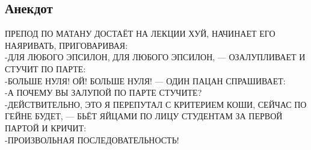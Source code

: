 \documentclass[12pt]{article}
\begin{document}
\subsection*{Анекдот}
ПРЕПОД ПО МАТАНУ ДОСТАЁТ НА ЛЕКЦИИ ХУЙ, НАЧИНАЕТ ЕГО НАЯРИВАТЬ, ПРИГОВАРИВАЯ:\\
-ДЛЯ ЛЮБОГО ЭПСИЛОН, ДЛЯ ЛЮБОГО ЭПСИЛОН, — ОЗАЛУПЛИВАЕТ И СТУЧИТ ПО ПАРТЕ:\\
-БОЛЬШЕ НУЛЯ! ОЙ! БОЛЬШЕ НУЛЯ! — ОДИН ПАЦАН СПРАШИВАЕТ:\\
-А ПОЧЕМУ ВЫ ЗАЛУПОЙ ПО ПАРТЕ СТУЧИТЕ?\\
-ДЕЙСТВИТЕЛЬНО, ЭТО Я ПЕРЕПУТАЛ С КРИТЕРИЕМ КОШИ, СЕЙЧАС ПО ГЕЙНЕ БУДЕТ, — БЬЁТ ЯЙЦАМИ ПО ЛИЦУ СТУДЕНТАМ ЗА ПЕРВОЙ ПАРТОЙ И КРИЧИТ:\\
-ПРОИЗВОЛЬНАЯ ПОСЛЕДОВАТЕЛЬНОСТЬ!
\end{document}
